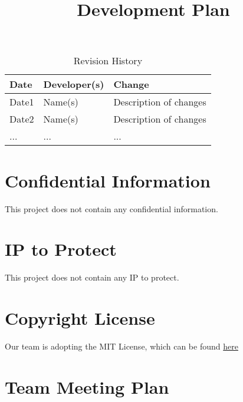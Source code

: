 \documentclass{article}
\title{Development Plan\\\progname}
\author{\authname}
\date{}
\begin{document}
\maketitle

\begin{table}[hp]
\caption{Revision History} \label{TblRevisionHistory}
\begin{tabularx}{\textwidth}{llX}
\toprule
\textbf{Date} & \textbf{Developer(s)} & \textbf{Change}\\
\midrule
Date1 & Name(s) & Description of changes\\
Date2 & Name(s) & Description of changes\\
... & ... & ...\\
\bottomrule
\end{tabularx}
\end{table}

\newpage{}



\section{Confidential Information}

This project does not contain any confidential information.


\section{IP to Protect}
This project does not contain any IP to protect. 
\section{Copyright License}

Our team is adopting the MIT License, which can be found \href{https://github.com/4G06-CAPSTONE-2025/Reading4All/blob/main/LICENSE} {here}

\section{Team Meeting Plan}
\end{document}
